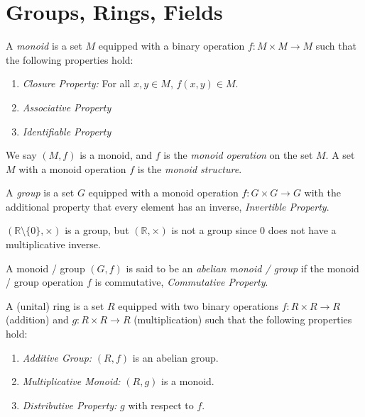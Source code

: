\documentclass[
	11pt, %
	fleqn, %
	a4paper, %
]{LegrandOrangeBook}
\begin{document}
\newpage

\section{Groups, Rings, Fields}

\begin{definition}[Monoid]
    A \emph{monoid} is a set $M$ equipped with a binary operation $f: M \times M \to M$ such that the following properties hold:
    \begin{enumerate}
        \item \emph{Closure Property:} For all $x,y \in M$, $f(x,y) \in M$.
        \item \emph{Associative Property}
        \item \emph{Identifiable Property}
    \end{enumerate}
    We say $(M, f)$ is a monoid, and $f$ is the \emph{monoid operation} on the set $M$. A set $M$ with a monoid operation $f$ is the \emph{monoid structure}.
\end{definition}

\begin{definition}[Group]
    A \emph{group} is a set $G$ equipped with a monoid operation $f: G \times G \to G$ with the additional property that every element has an inverse, \emph{Invertible Property}.
\end{definition}

\begin{example}
    $(\mathbb{R}\setminus\{0\}, \times)$ is a group, but $(\mathbb{R}, \times)$ is not a group since $0$ does not have a multiplicative inverse.
\end{example}

\begin{definition}
    A monoid / group $(G, f)$ is said to be an \emph{abelian monoid / group} if the monoid / group operation $f$ is commutative, \emph{Commutative Property}.
\end{definition}

\begin{definition}
    A (unital) ring is a set $R$ equipped with two binary operations $f: R \times R \to R$ (addition) and $g: R \times R \to R$ (multiplication) such that the following properties hold:
    \begin{enumerate}
        \item \emph{Additive Group:} $(R, f)$ is an abelian group.
        \item \emph{Multiplicative Monoid:} $(R, g)$ is a monoid.
        \item \emph{Distributive Property:} $g$ with respect to $f$.
    \end{enumerate}
\end{definition}
\end{document}
